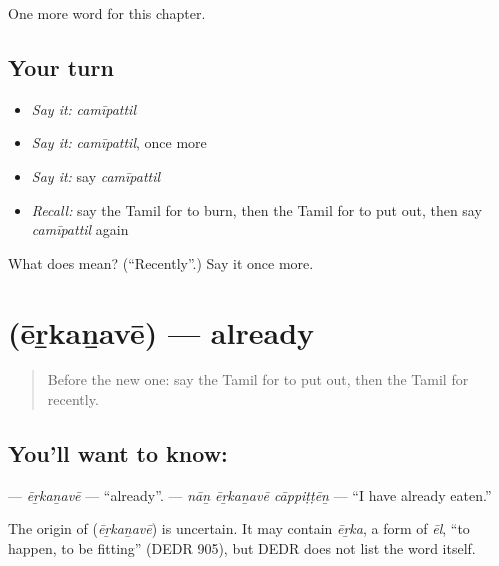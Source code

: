 \begin{grammarlens}[title={What you've built}]
One more word for this chapter.
\end{grammarlens}

\subsection*{Your turn}
\begin{itemize}
\raggedright
  \item \emph{Say it:} \emph{camīpattil}
  \item \emph{Say it:} \emph{camīpattil}, once more
  \item \emph{Say it:} say \emph{camīpattil}
  \item \emph{Recall:} say the Tamil for to burn, then the Tamil for to put out, then say \emph{camīpattil} again
\end{itemize}

\begin{tcolorbox}[breakable,colback=teal!4,colframe=teal!35!black,title={Before you move on}]
What does  mean? (\textquotedblleft{}Recently\textquotedblright{}.) Say it once more.
\end{tcolorbox}
\section[\texorpdfstring{\ta{ஏற்கனவே} (ēṟkaṉavē)}{ஏற்கனவே (ēṟkaṉavē)}]{ (ēṟkaṉavē) — already}

\label{lesson:TA-C158-erkanave}



\begin{quote}
Before the new one: say the Tamil for to put out, then the Tamil for recently.
\end{quote}

\subsection*{You'll want to know: }
\textbf{} — \emph{ēṟkaṉavē} — \textquotedblleft{}already\textquotedblright{}. \textbf{  } — \emph{nāṉ ēṟkaṉavē cāppiṭṭēṉ} — \textquotedblleft{}I have already eaten.\textquotedblright{}

\begin{cousinweb}
The origin of \textbf{} (\emph{ēṟkaṉavē}) is uncertain. It may contain \emph{ēṟka}, a form of \emph{ēl}, \textquotedblleft{}to happen, to be fitting\textquotedblright{} (DEDR 905), but DEDR does not list the word itself.
\end{cousinweb}

